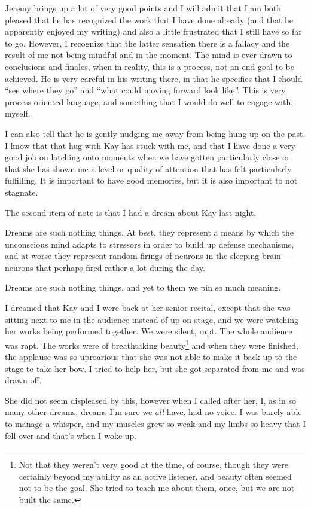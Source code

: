 Jeremy brings up a lot of very good points and I will admit that I am both pleased that he has recognized the work that I have done already (and that he apparently enjoyed my writing) and also a little frustrated that I still have so far to go. However, I recognize that the latter sensation there is a fallacy and the result of me not being mindful and in the moment. The mind is ever drawn to conclusions and finales, when in reality, this is a process, not an end goal to be achieved. He is very careful in his writing there, in that he specifies that I should ``see where they go'' and ``what could moving forward look like''. This is very process-oriented language, and something that I would do well to engage with, myself.

I can also tell that he is gently nudging me away from being hung up on the past. I know that that hug with Kay has stuck with me, and that I have done a very good job on latching onto moments when we have gotten particularly close or that she has shown me a level or quality of attention that has felt particularly fulfilling. It is important to have good memories, but it is also important to not stagnate.

The second item of note is that I had a dream about Kay last night.

Dreams are such nothing things. At best, they represent a means by which the unconscious mind adapts to stressors in order to build up defense mechanisms, and at worse they represent random firings of neurons in the sleeping brain --- neurons that perhaps fired rather a lot during the day.

Dreams are such nothing things, and yet to them we pin so much meaning.

I dreamed that Kay and I were back at her senior recital, except that she was sitting next to me in the audience instead of up on stage, and we were watching her works being performed together. We were silent, rapt. The whole audience was rapt. The works were of breathtaking beauty\footnote{Not that they weren't very good at the time, of course, though they were certainly beyond my ability as an active listener, and beauty often seemed not to be the goal. She tried to teach me about them, once, but we are not built the same.} and when they were finished, the applause was so uproarious that she was not able to make it back up to the stage to take her bow. I tried to help her, but she got separated from me and was drawn off.

She did not seem displeased by this, however when I called after her, I, as in so many other dreams, dreams I'm sure we \emph{all} have, had no voice. I was barely able to manage a whisper, and my muscles grew so weak and my limbs so heavy that I fell over and that's when I woke up.

